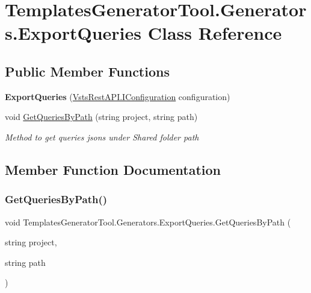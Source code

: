 \hypertarget{class_templates_generator_tool_1_1_generators_1_1_export_queries}{}\section{Templates\+Generator\+Tool.\+Generators.\+Export\+Queries Class Reference}
\label{class_templates_generator_tool_1_1_generators_1_1_export_queries}
\subsection*{Public Member Functions}
\begin{DoxyCompactItemize}
\item 
\mbox{\label{class_templates_generator_tool_1_1_generators_1_1_export_queries_a558cf669caa0f03158bc099e95b1cb6a}} 
{\bfseries Export\+Queries} (\mbox{\hyperlink{interface_vsts_rest_a_p_i_1_1_i_configuration}{Vsts\+Rest\+A\+P\+I.\+I\+Configuration}} configuration)
\item 
void \mbox{\hyperlink{class_templates_generator_tool_1_1_generators_1_1_export_queries_a5891d5275dcffb8a38960ccb7de53004}{Get\+Queries\+By\+Path}} (string project, string path)
\begin{DoxyCompactList}\small\item\em Method to get queries jsons under Shared folder path \end{DoxyCompactList}\end{DoxyCompactItemize}


\subsection{Member Function Documentation}
\mbox{\label{class_templates_generator_tool_1_1_generators_1_1_export_queries_a5891d5275dcffb8a38960ccb7de53004}} 
\subsubsection{\texorpdfstring{Get\+Queries\+By\+Path()}{GetQueriesByPath()}}
{\footnotesize\ttfamily void Templates\+Generator\+Tool.\+Generators.\+Export\+Queries.\+Get\+Queries\+By\+Path (\begin{DoxyParamCaption}\item[{string}]{project,  }\item[{string}]{path }\end{DoxyParamCaption})}



